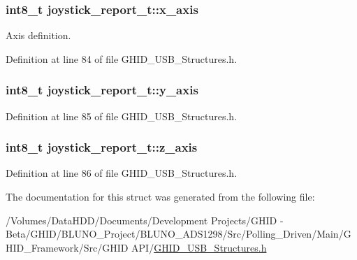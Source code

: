 \hypertarget{structjoystick__report__t_a00eddcf4aba7402e3f0fdd1e7ab09d13}{
\subsubsection[{x\-\_\-axis}]{\setlength{\rightskip}{0pt plus 5cm}int8\-\_\-t {\bf joystick\-\_\-report\-\_\-t\-::x\-\_\-axis}}}\label{structjoystick__report__t_a00eddcf4aba7402e3f0fdd1e7ab09d13}


\-Axis definition. 



\-Definition at line 84 of file \-G\-H\-I\-D\-\_\-\-U\-S\-B\-\_\-\-Structures.\-h.

\hypertarget{structjoystick__report__t_a6abec4aa980f7c029aaaa216c448e7af}{
\subsubsection[{y\-\_\-axis}]{\setlength{\rightskip}{0pt plus 5cm}int8\-\_\-t {\bf joystick\-\_\-report\-\_\-t\-::y\-\_\-axis}}}\label{structjoystick__report__t_a6abec4aa980f7c029aaaa216c448e7af}


\-Definition at line 85 of file \-G\-H\-I\-D\-\_\-\-U\-S\-B\-\_\-\-Structures.\-h.

\hypertarget{structjoystick__report__t_ab213b4d95036f350509ba4e4f056ca97}{
\subsubsection[{z\-\_\-axis}]{\setlength{\rightskip}{0pt plus 5cm}int8\-\_\-t {\bf joystick\-\_\-report\-\_\-t\-::z\-\_\-axis}}}\label{structjoystick__report__t_ab213b4d95036f350509ba4e4f056ca97}


\-Definition at line 86 of file \-G\-H\-I\-D\-\_\-\-U\-S\-B\-\_\-\-Structures.\-h.



\-The documentation for this struct was generated from the following file\-:\begin{DoxyCompactItemize}
\item 
/\-Volumes/\-Data\-H\-D\-D/\-Documents/\-Development Projects/\-G\-H\-I\-D -\/ Beta/\-G\-H\-I\-D/\-B\-L\-U\-N\-O\-\_\-\-Project/\-B\-L\-U\-N\-O\-\_\-\-A\-D\-S1298/\-Src/\-Polling\-\_\-\-Driven/\-Main/\-G\-H\-I\-D\-\_\-\-Framework/\-Src/\-G\-H\-I\-D A\-P\-I/\hyperlink{_g_h_i_d___u_s_b___structures_8h}{\-G\-H\-I\-D\-\_\-\-U\-S\-B\-\_\-\-Structures.\-h}\end{DoxyCompactItemize}
